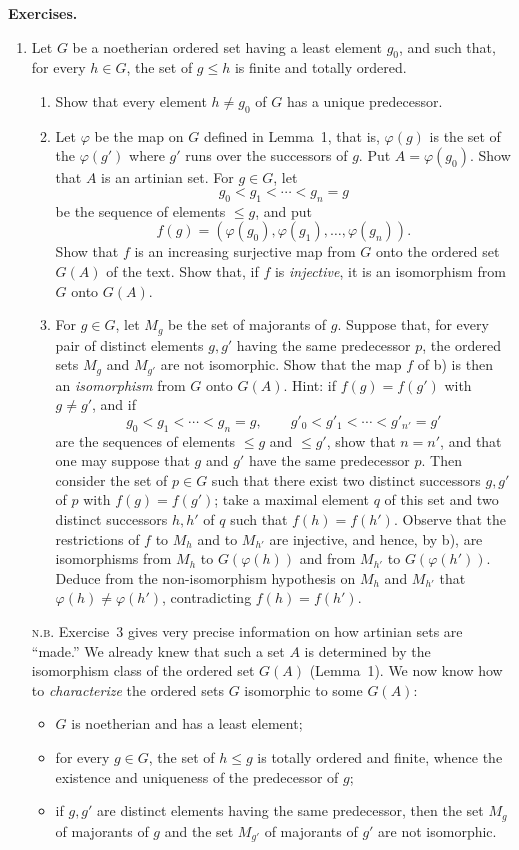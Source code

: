 \documentclass[11pt]{article}
\newcommand{\NB}{\textsc{n.b.}}
\newenvironment{remarktext}[1]{\par\medskip\noindent\textbf{#1.}\ }{\par\medskip}
\begin{document}
\begin{remarktext}{Exercises}
\begin{enumerate}[label=\arabic*)]
\item Let \(G\) be a noetherian ordered set having a least element \(g_0\), and such that, for every \(h\in G\), the set of \(g\leq h\) is finite and totally ordered.
\begin{enumerate}[label=\alph*)]
\item Show that every element \(h\neq g_0\) of \(G\) has a unique predecessor.
\item Let \(\varphi\) be the map on \(G\) defined in Lemma~1, that is, \(\varphi(g)\) is the set of the \(\varphi(g')\) where \(g'\) runs over the successors of \(g\). Put \(A=\varphi(g_0)\). Show that \(A\) is an artinian set. For \(g\in G\), let
\[
 g_0<g_1<\cdots<g_n=g
\]
be the sequence of elements \(\leq g\), and put
\[
 f(g)=(\varphi(g_0),\varphi(g_1),\ldots,\varphi(g_n)).
\]
Show that \(f\) is an increasing surjective map from \(G\) onto the ordered set \(G(A)\) of the text. Show that, if \(f\) is \emph{injective}, it is an isomorphism from \(G\) onto \(G(A)\).
\item For \(g\in G\), let \(M_g\) be the set of majorants of \(g\). Suppose that, for every pair of distinct elements \(g,g'\) having the same predecessor \(p\), the ordered sets \(M_g\) and \(M_{g'}\) are not isomorphic. Show that the map \(f\) of b) is then an \emph{isomorphism} from \(G\) onto \(G(A)\). Hint: if \(f(g)=f(g')\) with \(g\neq g'\), and if
\[
 g_0<g_1<\cdots<g_n=g,
 \qquad
 g'_0<g'_1<\cdots<g'_{n'}=g'
\]
are the sequences of elements \(\leq g\) and \(\leq g'\), show that \(n=n'\), and that one may suppose that \(g\) and \(g'\) have the same predecessor \(p\). Then consider the set of \(p\in G\) such that there exist two distinct successors \(g,g'\) of \(p\) with \(f(g)=f(g')\); take a maximal element \(q\) of this set and two distinct successors \(h,h'\) of \(q\) such that \(f(h)=f(h')\). Observe that the restrictions of \(f\) to \(M_h\) and to \(M_{h'}\) are injective, and hence, by b), are isomorphisms from \(M_h\) to \(G(\varphi(h))\) and from \(M_{h'}\) to \(G(\varphi(h'))\). Deduce from the non-isomorphism hypothesis on \(M_h\) and \(M_{h'}\) that \(\varphi(h)\neq\varphi(h')\), contradicting \(f(h)=f(h')\).
\end{enumerate}

\NB{} Exercise~3 gives very precise information on how artinian sets are ``made.'' We already knew that such a set \(A\) is determined by the isomorphism class of the ordered set \(G(A)\) (Lemma~1). We now know how to \emph{characterize} the ordered sets \(G\) isomorphic to some \(G(A)\):
\begin{itemize}[leftmargin=4em]
\item[\(\alpha\))] \(G\) is noetherian and has a least element;
\item[\(\beta\))] for every \(g\in G\), the set of \(h\leq g\) is totally ordered and finite, whence the existence and uniqueness of the predecessor of \(g\);
\item[\(\gamma\))] if \(g,g'\) are distinct elements having the same predecessor, then the set \(M_g\) of majorants of \(g\) and the set \(M_{g'}\) of majorants of \(g'\) are not isomorphic.
\end{itemize}


\end{enumerate}
\end{remarktext}
\end{document}
